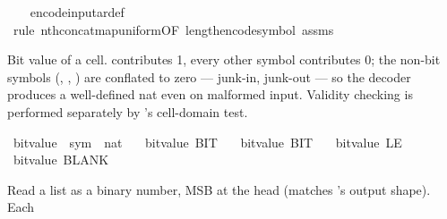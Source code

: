 \begin{isabellebody}
%
\isadelimproof
\ \ %
\endisadelimproof
%
\isatagproof
{}\isamarkupfalse%
\ encode{\isacharunderscore}{\kern0pt}input{\isacharunderscore}{\kern0pt}ar{\isacharunderscore}{\kern0pt}def\isanewline
\ \ \isamarkupfalse%
\ {\isacharparenleft}{\kern0pt}rule\ nth{\isacharunderscore}{\kern0pt}concat{\isacharunderscore}{\kern0pt}map{\isacharunderscore}{\kern0pt}uniform{\isacharbrackleft}{\kern0pt}OF\ length{\isacharunderscore}{\kern0pt}encode{\isacharunderscore}{\kern0pt}symbol\ assms{\isacharbrackright}{\kern0pt}{\isacharparenright}{\kern0pt}%
\endisatagproof
{\isafoldproof}%
%
\isadelimproof
%
\endisadelimproof
%
\isadelimdocument
%
\endisadelimdocument
%
\isatagdocument
%
\isamarkuptrue%
%
\endisatagdocument
{\isafolddocument}%
%
\isadelimdocument
%
\endisadelimdocument
%
\begin{isamarkuptext}%
Bit value of a  cell.   contributes
  1, every other symbol contributes 0; the non-bit symbols
  (, , ) are conflated to
  zero — junk-in, junk-out — so the decoder produces a
  well-defined nat even on malformed input.  Validity checking
  is performed separately by 's cell-domain
  test.%
\end{isamarkuptext}\isamarkuptrue%
\isamarkupfalse%
\ bit{\isacharunderscore}{\kern0pt}value\ {\isacharcolon}{\kern0pt}{\isacharcolon}{\kern0pt}\ {\isachardoublequoteopen}sym{}\ {\isasymRightarrow}\ nat{\isachardoublequoteclose}\ \isanewline
\ \ {\isachardoublequoteopen}bit{\isacharunderscore}{\kern0pt}value\ BIT{}\ {\isacharequal}{\kern0pt}\ {}{\isachardoublequoteclose}\isanewline
{\isacharbar}{\kern0pt}\ {\isachardoublequoteopen}bit{\isacharunderscore}{\kern0pt}value\ BIT{}\ {\isacharequal}{\kern0pt}\ {}{\isachardoublequoteclose}\isanewline
{\isacharbar}{\kern0pt}\ {\isachardoublequoteopen}bit{\isacharunderscore}{\kern0pt}value\ LE{}\ {\isacharequal}{\kern0pt}\ {}{\isachardoublequoteclose}\isanewline
{\isacharbar}{\kern0pt}\ {\isachardoublequoteopen}bit{\isacharunderscore}{\kern0pt}value\ BLANK{}\ {\isacharequal}{\kern0pt}\ {}{\isachardoublequoteclose}%
\begin{isamarkuptext}%
Read a  list as a binary number, MSB at the
  head (matches 's output shape).  Each

\end{isamarkuptext}
\end{isabellebody}
